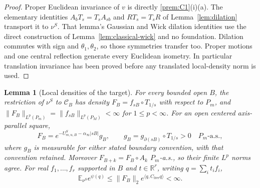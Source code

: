 \documentclass[11pt]{article}
\theoremstyle{plain}
\newtheorem{lemma}[theorem]{Lemma}
\theoremstyle{definition}
\theoremstyle{remark}
\newcommand{\R}{\mathbb{R}}
\newcommand{\E}{\mathbb{E}}
\newcommand{\cC}{\mathcal{C}}
\newcommand{\Cfree}{C_{\mathrm{free}}}
\begin{document}
\begin{proof}
Proper Euclidean invariance of $v$ is directly \ref{prem:C1}(i)(a).
The elementary identities $A_bT_s=T_sA_{sb}$ and $RT_s=T_sR$ of
Lemma~\ref{lem:dilation} transport it to $\nu^S$. That lemma's Gaussian and
Wick dilation identities use the direct construction of
Lemma~\ref{lem:classical-wick} and no foundation. Dilation commutes with
sign and $\theta_1,\theta_2$, so those symmetries transfer too. Proper
motions and one central reflection generate every Euclidean isometry.
In particular translation invariance has been proved before any translated
local-density norm is used.
\end{proof}

\begin{lemma}[Local densities of the target]\label{lem:localdensity}
For every bounded open $B$, the restriction of $\nu^S$ to $\cC_B$ has
density $F_B=f_{sB}\circ T_{1/s}$ with respect to $P_m$, and
$\|F_B\|_{L^p(P_m)}=\|f_{sB}\|_{L^p(P_M)}<\infty$ for $1\le p<\infty$.
For an open centered axis-parallel square,
\begin{equation}\label{eq:local-square-density}
 F_B=e^{-U^S_{m,u,B}-\alpha_\infty|sB|}g_B,
 \qquad g_B=g_{\partial(sB)}\circ T_{1/s}>0\quad P_m\text{-a.s.},
\end{equation}
where $g_B$ is measurable for either stated boundary convention, with that
convention retained. Moreover $F_{B+k}=F_B\circ A_k$ $P_m$-a.s., so their
finite $L^p$ norms agree. For real $f_1,\ldots,f_r$ supported in $B$ and
$t\in\R^r$, writing $q=\sum_i t_i f_i$,
\begin{equation}\label{eq:local-exponential}
 \E_{\nu^S}e^{\psi(q)}\le\|F_B\|_2
       e^{\langle q,\Cfree q\rangle}<\infty.
\end{equation}
\end{lemma}
\end{document}
